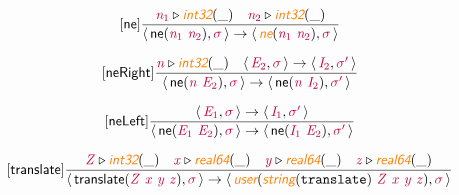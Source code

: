 \documentclass[10pt,leqno,fleqn]{article}
\newcommand{\artVariable}[1]{\mbox{\color{purple}\em #1\/}}
\newcommand{\artConstructor}[1]{\mbox{\sf #1}}
\newcommand{\artCaseInsensitiveLiteral}[1]{\mbox{\tt #1}}
\newcommand{\artSpecial}[1]{\mbox{\color{orange}\sf\em #1}}
\begin{document}
\begin{equation}
\tag*{[\artConstructor{\sf ne}]}
\begin{split}\frac{ \artVariable{n$_{1}$}\triangleright \artSpecial{int32}(\_) \quad  \artVariable{n$_{2}$}\triangleright \artSpecial{int32}(\_) }{\langle\, \artConstructor{\sf ne}(\artVariable{n$_{1}$}\ \artVariable{n$_{2}$}), \artVariable{$\sigma$}\,\rangle \rightarrow \langle\, \artSpecial{ne}(\artVariable{n$_{1}$}\ \artVariable{n$_{2}$}), \artVariable{$\sigma$}\,\rangle }
\end{split}
\end{equation}

\begin{equation}
\tag*{[\artConstructor{\sf neRight}]}
\begin{split}\frac{ \artVariable{n}\triangleright \artSpecial{int32}(\_) \quad \langle\, \artVariable{E$_{2}$}, \artVariable{$\sigma$}\,\rangle \rightarrow \langle\, \artVariable{I$_{2}$}, \artVariable{$\sigma$\/$^\prime$}\,\rangle }{\langle\, \artConstructor{\sf ne}(\artVariable{n}\ \artVariable{E$_{2}$}), \artVariable{$\sigma$}\,\rangle \rightarrow \langle\, \artConstructor{\sf ne}(\artVariable{n}\ \artVariable{I$_{2}$}), \artVariable{$\sigma$\/$^\prime$}\,\rangle }
\end{split}
\end{equation}

\begin{equation}
\tag*{[\artConstructor{\sf neLeft}]}
\begin{split}\frac{\langle\, \artVariable{E$_{1}$}, \artVariable{$\sigma$}\,\rangle \rightarrow \langle\, \artVariable{I$_{1}$}, \artVariable{$\sigma$\/$^\prime$}\,\rangle }{\langle\, \artConstructor{\sf ne}(\artVariable{E$_{1}$}\ \artVariable{E$_{2}$}), \artVariable{$\sigma$}\,\rangle \rightarrow \langle\, \artConstructor{\sf ne}(\artVariable{I$_{1}$}\ \artVariable{E$_{2}$}), \artVariable{$\sigma$\/$^\prime$}\,\rangle }
\end{split}
\end{equation}

\begin{equation}
\tag*{[\artConstructor{\sf translate}]}
\begin{split}\frac{ \artVariable{Z}\triangleright \artSpecial{int32}(\_) \quad  \artVariable{x}\triangleright \artSpecial{real64}(\_) \quad  \artVariable{y}\triangleright \artSpecial{real64}(\_) \quad  \artVariable{z}\triangleright \artSpecial{real64}(\_) }{\langle\, \artConstructor{\sf translate}(\artVariable{Z}\ \artVariable{x}\ \artVariable{y}\ \artVariable{z}), \artVariable{$\sigma$}\,\rangle \rightarrow \langle\, \artSpecial{user}(\artSpecial{string}(\artCaseInsensitiveLiteral{translate})\ \artVariable{Z}\ \artVariable{x}\ \artVariable{y}\ \artVariable{z}), \artVariable{$\sigma$}\,\rangle }
\end{split}
\end{equation}
\end{document}
